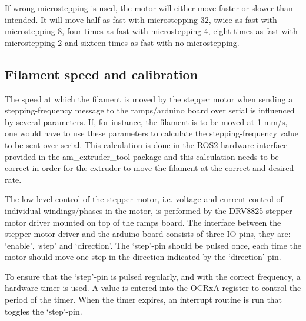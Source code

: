 \documentclass[10pt]{article}
\begin{document}
If wrong microstepping is used, the motor will either move faster or slower than intended. It will move half as fast with microstepping 32, twice as fast with microstepping 8, four times as fast with microstepping 4, eight times as fast with microstepping 2 and sixteen times as fast with no microstepping.

\subsection{Filament speed and calibration}
The speed at which the filament is moved by the stepper motor when sending a stepping-frequency message to the ramps/arduino board over serial is influenced by several parameters. If, for instance, the filament is to be moved at 1 mm/s, one would have to use these parameters to calculate the stepping-frequency value to be sent over serial. This calculation is done in the ROS2 hardware interface provided in the am\_extruder\_tool package and this calculation needs to be correct in order for the extruder to move the filament at the correct and desired rate.

The low level control of the stepper motor, i.e. voltage and current control of individual windings/phases in the motor, is performed by the DRV8825 stepper motor driver mounted on top of the ramps board. The interface between the stepper motor driver and the arduino board consists of three IO-pins, they are: `enable', `step' and `direction'. The `step'-pin should be pulsed once, each time the motor should move one step in the direction indicated by the `direction'-pin.

To ensure that the `step'-pin is pulsed regularly, and with the correct frequency, a hardware timer is used. A value is entered into the OCRxA register to control the period of the timer. When the timer expires, an interrupt routine is run that toggles the `step'-pin.
\end{document}

